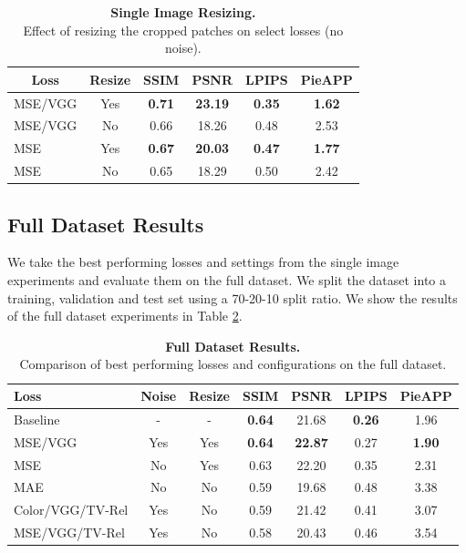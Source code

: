 \begin{table}
    \centering
    \captionsetup{justification=centering}
    \setlength{\tabcolsep}{0.5em}
    \caption{
        \textbf{Single Image Resizing.} \\ Effect of resizing the cropped patches on select losses (no noise).
    }
    \begin{tabular}{lccccc}
        \toprule
        \multicolumn{1}{c}{Loss}& \multicolumn{1}{c}{Resize}&  SSIM & PSNR & LPIPS & PieAPP\\
        \midrule
        MSE/VGG & Yes & \textbf{0.71} & \textbf{23.19} & \textbf{0.35} & \textbf{1.62} \\
        MSE/VGG & No & 0.66 & 18.26 & 0.48 & 2.53 \\
        \midrule
        MSE & Yes & \textbf{0.67} & \textbf{20.03} & \textbf{0.47} & \textbf{1.77} \\
        MSE & No & 0.65 & 18.29 & 0.50 & 2.42 \\

        \bottomrule
    \end{tabular}
    
    \label{tab:single-image-resize}
\end{table}


\subsection{Full Dataset Results}

We take the best performing losses and settings from the single image experiments and evaluate them on the full dataset. We split the dataset into a training, validation and test set using a 70-20-10 split ratio. We show the results of the full dataset experiments in Table \ref{tab:full-data-results}.

\begin{table}
    \centering
    \captionsetup{justification=centering}
    \caption{\textbf{Full Dataset Results.} \\ Comparison of best performing losses and configurations on the full dataset.}
    \setlength{\tabcolsep}{0.3em}
    \begin{tabular}{lcccccc}
        \toprule
        Loss & Noise & Resize & SSIM & PSNR & LPIPS & PieAPP \\
        \midrule
        Baseline & - & - & \textbf{0.64} & 21.68 & \textbf{0.26} & 1.96 \\
        MSE/VGG & Yes & Yes & \textbf{0.64} & \textbf{22.87} & 0.27 & \textbf{1.90} \\
        MSE & No & Yes & 0.63 & 22.20 & 0.35 & 2.31 \\
        MAE & No & No & 0.59 & 19.68 & 0.48 & 3.38 \\
        Color/VGG/TV-Rel & Yes & No & 0.59 & 21.42 & 0.41 & 3.07 \\
        MSE/VGG/TV-Rel & Yes & No & 0.58 & 20.43 & 0.46 & 3.54 \\
        \bottomrule
    \end{tabular}
    \label{tab:full-data-results}
\end{table}

